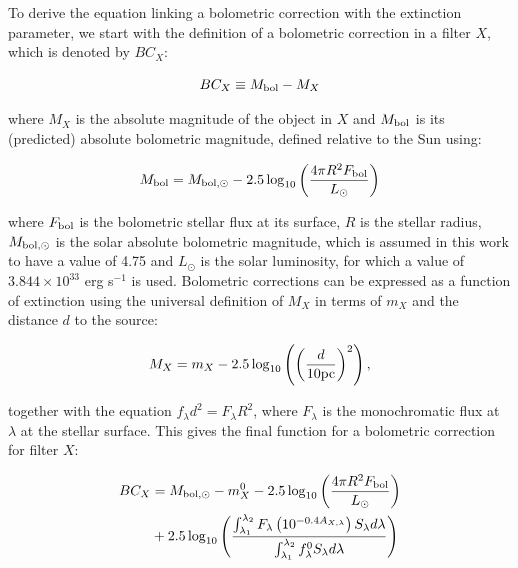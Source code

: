 \documentclass[12pt, a4paper]{report}
\begin{document}
To derive the equation linking a bolometric correction with the extinction parameter, we start with the definition of a bolometric correction in a filter $X$, which is denoted by $BC_{X}$:

\begin{equation}
BC_{X} \equiv M_{\textnormal{bol}} - M_{X}
\label{BC_def}
\end{equation}

where $M_{X}$ is the absolute magnitude of the object in $X$ and $M_{\textnormal{bol}}$ is its (predicted) absolute bolometric magnitude, defined relative to the Sun using:

\begin{equation}
M_{\textnormal{bol}} = M_{\textnormal{bol},\odot} - 2.5 \log_{10} \left( \frac{4\pi R^{2}F_{\textnormal{bol}}}{L_{\odot}} \right)
\label{mbol_sun}
\end{equation}

where  $F_{\textnormal{bol}}$ is the bolometric stellar flux at its surface, $R$ is the stellar radius, $M_{\textnormal{bol},\odot}$ is the solar absolute bolometric magnitude, which is assumed in this work to have a value of 4.75 and $L_{\odot}$ is the solar luminosity, for which a value of $3.844 \times 10^{33}$ erg s$^{-1}$ is used. Bolometric corrections can be expressed as a function of extinction using the universal definition of $M_{X}$ in terms of $m_{X}$ and the distance $d$ to the source:

\begin{equation}
M_{X} = m_{X} - 2.5 \log_{10}\left( \left( \frac{d}{10 \textnormal{pc}} \right)^{2} \right),
\label{abs_mag_def}
\end{equation}

together with the equation $f_{\lambda}d^{2}=F_{\lambda}R^{2}$, where $F_{\lambda}$ is the monochromatic flux at $\lambda$ at the stellar surface. This gives the final function for a bolometric correction for filter $X$:

\begin{align}
\begin{split}
BC_{X} &= M_{\textnormal{bol},\odot} - m_{X}^{0} - 2.5 \log_{10} \left( \frac{4\pi R^{2}F_{\textnormal{bol}}}{L_{\odot}} \right) \\
&+ 2.5 \log_{10} \left( \frac{\int_{\lambda_{1}}^{\lambda_{2}} F_{\lambda} \left( 10^{-0.4 A_{X,\lambda}} \right) S_{\lambda} d\lambda}{\int_{\lambda_{1}}^{\lambda_{2}} f_{\lambda}^{0} S_{\lambda} d\lambda} \right)
\label{BC_extinc}
\end{split}
\end{align}
\end{document}

